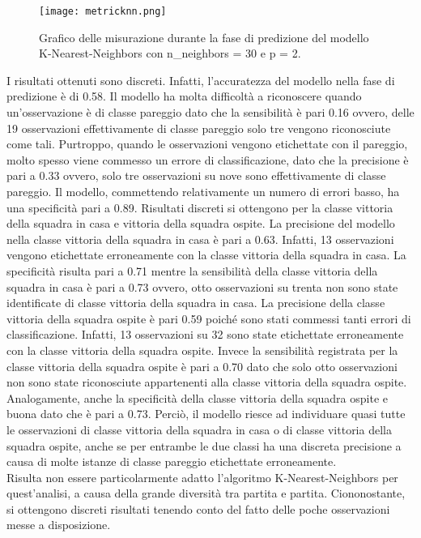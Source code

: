 \begin{figure}[h]
	\begin{center}
		\texttt{[image: metricknn.png]}
		\caption{Grafico delle misurazione durante la fase di predizione del modello K-Nearest-Neighbors con\textsf{ n\_neighbors} = 30 e \textsf{p} = 2.
		} 
		\label{fig:knnmetrics}
	\end{center}
\end{figure}
I risultati ottenuti sono discreti. Infatti, l'accuratezza del modello nella fase di predizione è di 0.58. Il modello ha molta difficoltà a riconoscere quando un’osservazione è di classe pareggio dato che la sensibilità è pari 0.16 ovvero, delle 19 osservazioni effettivamente di classe pareggio solo tre vengono riconosciute come tali. Purtroppo, quando le osservazioni vengono etichettate con il pareggio, molto spesso viene commesso un errore di classificazione, dato che la precisione è pari a 0.33 ovvero, solo tre osservazioni su nove %
sono effettivamente di classe pareggio. Il modello, commettendo relativamente un numero di errori basso, ha una specificità pari a 0.89. Risultati discreti si ottengono per la classe vittoria della squadra in casa e vittoria della squadra ospite. La precisione del modello nella classe vittoria della squadra in casa è pari a 0.63. Infatti, 13 osservazioni vengono etichettate erroneamente con la classe vittoria della squadra in casa. La specificità risulta pari a 0.71 mentre la sensibilità della classe vittoria della squadra in casa è pari a 0.73 ovvero, otto osservazioni su trenta non sono state identificate di classe vittoria della squadra in casa. La precisione della classe vittoria della squadra ospite è pari 0.59 poiché sono stati commessi tanti errori di classificazione. Infatti, 13 osservazioni su 32 sono state etichettate erroneamente con la classe vittoria della squadra ospite. Invece la sensibilità registrata per la classe vittoria della squadra ospite è pari a 0.70 dato che solo otto osservazioni non sono state riconosciute appartenenti alla classe vittoria della squadra ospite. Analogamente, anche la specificità della classe vittoria della squadra ospite e buona dato che è pari a 0.73. Perciò, il modello riesce ad individuare quasi tutte le osservazioni di classe vittoria della squadra in casa o di classe vittoria della squadra ospite, anche se per entrambe le due classi ha una discreta precisione a causa di molte istanze di classe pareggio etichettate erroneamente.\\
Risulta non essere particolarmente adatto l'algoritmo K-Nearest-Neighbors per quest'analisi, a causa della grande diversità tra partita e partita. Ciononostante, si ottengono discreti risultati tenendo conto del fatto delle poche osservazioni messe a disposizione.
